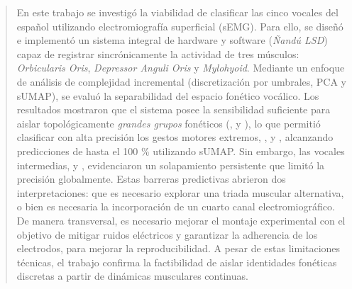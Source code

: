 \documentclass[11pt, letterpaper]{article}
\begin{document}
\begin{abstract}

En este trabajo se investigó la viabilidad de clasificar las cinco vocales del español utilizando electromiografía superficial (sEMG). Para ello, se diseñó e implementó un sistema integral de hardware y software (\textit{Ñandú LSD}) capaz de registrar sincrónicamente la actividad de tres músculos: \textit{Orbicularis Oris}, \textit{Depressor Anguli Oris} y \textit{Mylohyoid}. Mediante un enfoque de análisis de complejidad incremental (discretización por umbrales, PCA y sUMAP), se evaluó la separabilidad del espacio fonético vocálico. Los resultados mostraron que el sistema posee la sensibilidad suficiente para aislar topológicamente \textit{grandes grupos} fonéticos (,  y ), lo que permitió clasificar con alta precisión los gestos motores extremos, ,  y , alcanzando predicciones de hasta el 100 \% utilizando sUMAP. Sin embargo, las vocales intermedias,  y , evidenciaron un solapamiento persistente que limitó la precisión globalmente. Estas barreras predictivas abrieron dos interpretaciones: que es necesario explorar una triada muscular alternativa, o bien es necesaria la incorporación de un cuarto canal electromiográfico. De manera transversal, es necesario mejorar el montaje experimental con el objetivo de mitigar ruidos eléctricos y garantizar la adherencia de los electrodos, para mejorar la reproducibilidad. A pesar de estas limitaciones técnicas, el trabajo confirma la factibilidad de aislar identidades fonéticas discretas a partir de dinámicas musculares continuas.

\end{abstract}
\end{document}

